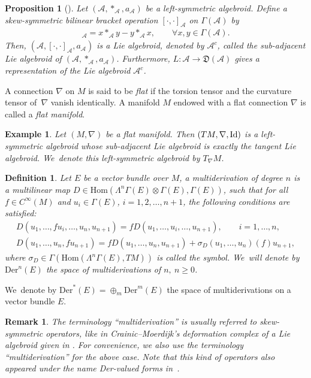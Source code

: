 \documentclass[pdftex]{sigma}%
\numberwithin{equation}{section}
\newtheorem{pro}[thm]{Proposition}
\newtheorem{ex}[thm]{Example}
\newtheorem{rmk}[thm]{Remark}
\newtheorem{defi}[thm]{Definition}
\newcommand{\huaA}{\mathcal{A}}
\newcommand{\frkD}{\mathfrak D}
\newcommand{\Id}{\rm{Id}}
\newcommand{\Hom}{\mathrm{Hom}}
\newcommand{\Der}{\mathrm{Der}}
\begin{document}
\begin{pro}[\cite{LiuShengBaiChen}]%
 Let $(\huaA,\ast_\huaA, a_\huaA)$ be a left-symmetric algebroid. Define a skew-symmetric bilinear bracket operation $[\cdot,\cdot]_\huaA$ on $\Gamma(\huaA)$ by
\begin{gather*}
 [x,y]_\huaA=x\ast_{\huaA} y-y\ast_{\huaA} x,\qquad
 \forall x,y\in\Gamma(\huaA).
\end{gather*}
Then, $(\huaA,[\cdot,\cdot]_\huaA,a_\huaA)$ is a Lie algebroid, denoted by
$\huaA^c$, called the {\it sub-adjacent Lie algebroid} of
 $(\huaA,\ast_\huaA,a_\huaA)$. Furthermore, $L\colon \huaA\longrightarrow \frkD(\huaA)$ gives a
 representation of the Lie algebroid $\huaA^c$.
\end{pro}

A connection $\nabla$ on $M$ is said to be {\it flat} if the torsion tensor and the curvature tensor of~$\nabla$ vanish identically. A manifold $M$ endowed with a flat connection $\nabla$ is called a {\it flat manifold}.

\begin{ex}\label{ex:main}Let $(M,\nabla)$ be a flat manifold. Then $(TM,\nabla,\Id)$ is a left-symmetric algebroid whose sub-adjacent Lie algebroid is
exactly the tangent Lie algebroid. We~denote this left-symmetric algebroid by $T_\nabla M$.
\end{ex}

\begin{defi}
Let $E$ be a vector bundle over $M$, a {\it multiderivation} of degree $n$
is a multilinear map $D\in \Hom(\Lambda^{n}\Gamma(E)\otimes
\Gamma(E),\Gamma(E))$, such that for all $f\in C^\infty(M)$ and
$u_i\in \Gamma(E)$, $i=1,2,\dots,n+1$, the following conditions are satisfied:
 \begin{gather*}
D(u_1,\dots,fu_i,\dots,u_{n},u_{n+1})=f D(u_1,\dots,u_i,\dots,u_{n+1}),\qquad i=1,\dots,n,
\\
D(u_1,\dots,u_{n},fu_{n+1})=f D(u_1,\dots,u_{n},u_{n+1})+\sigma_D(u_1,\dots,u_{n})(f)u_{n+1},
\end{gather*}
where $\sigma_D\in \Gamma(\Hom(\Lambda^{n}\Gamma(E),TM))$ is called the
{\it symbol}. We~will denote by $\Der^n(E)$ the space of multiderivations
of $n,~n\geq 0$.
\end{defi}
We~denote by $\Der^*(E)=\oplus_{m}\Der^m(E)$ the space of multiderivations on a vector bundle $E$.

\begin{rmk}
The terminology ``multiderivation'' is usually referred to skew-symmetric ope\-ra\-tors, like in Crainic--Moerdijk's deformation complex of a Lie algebroid given in \cite{deformation-cohomology-LA}. For convenience, we also use the terminology ``multiderivation'' for the above case. Note that this kind of operators also appeared under the name {\rm Der}-valued forms in~\cite{Vita}.	
	\end{rmk}
\end{document}
